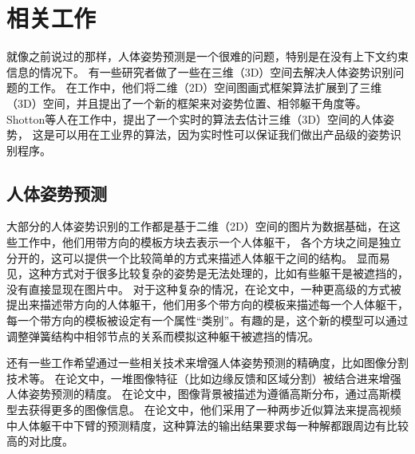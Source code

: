 
\chapter{相关工作}
\label{chap:related}
就像之前说过的那样，人体姿势预测是一个很难的问题，特别是在没有上下文约束信息的情况下。
有一些研究者做了一些在三维（3D）空间去解决人体姿势识别问题的工作\cite{burenius20133d,ics14cvpr}。
在工作\cite{burenius20133d}中，他们将二维（2D）空间图画式框架算法\cite{ps1,ps2}扩展到了三维（3D）空间，并且提出了一个新的框架来对姿势位置、相邻躯干角度等。
Shotton等人在工作\cite{shotton2013real}中，提出了一个实时的算法去估计三维（3D）空间的人体姿势，
这是可以用在工业界的算法，因为实时性可以保证我们做出产品级的姿势识别程序。

\section{人体姿势预测}
大部分的人体姿势识别的工作都是基于二维（2D）空间的图片为数据基础，在这些工作中，他们用带方向的模板方块去表示一个人体躯干，
各个方块之间是独立分开的，这可以提供一个比较简单的方式来描述人体躯干之间的结构。
显而易见，这种方式对于很多比较复杂的姿势是无法处理的\cite{nips06,cvpr10}，比如有些躯干是被遮挡的，没有直接显现在图片中。
对于这种复杂的情况，在论文\cite{deva11}中，一种更高级的方式被提出来描述带方向的人体躯干，他们用多个带方向的模板来描述每一个人体躯干，
每一个带方向的模板被设定有一个属性“类别”。有趣的是，这个新的模型可以通过调整弹簧结构中相邻节点的关系而模拟这种躯干被遮挡的情况。

还有一些工作希望通过一些相关技术来增强人体姿势预测的精确度，比如图像分割技术等。
在论文\cite{eccv10}中，一堆图像特征（比如边缘反馈和区域分割）被结合进来增强人体姿势预测的精度。
在论文\cite{songchun}中，图像背景被描述为遵循高斯分布，通过高斯模型去获得更多的图像信息。
在论文\cite{mixing}中，他们采用了一种两步近似算法来提高视频中人体躯干中下臂的预测精度，这种算法的输出结果要求每一种解都跟周边有比较高的对比度。

